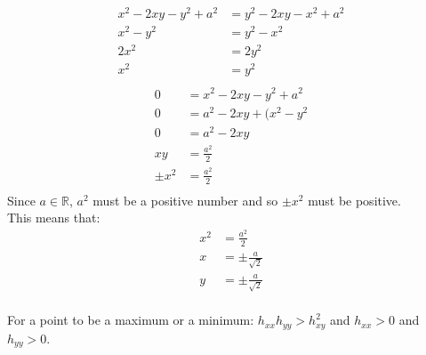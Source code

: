 \documentclass[10pt,\jkfside,a4paper]{article}
\begin{document}
\begin{enumerate}
\begin{equation}
\begin{split}
x^{2} - 2xy - y^{2} + a^2 &= y^{2} - 2xy - x^{2} + a^2 \\
x^{2} - y^{2} &= y^{2} - x^{2} \\
2x^{2} &= 2y^{2} \\
x^{2} &= y^{2} \\
\end{split}
\end{equation}
\begin{equation}
\begin{split}
0 &= x^{2} - 2xy - y^{2} + a^2 \\
0 &= a^2 - 2xy + (x^{2} - y^{2} \\
0 &= a^2 - 2xy \\
xy &= \frac{a^2}{2} \\
\pm x^{2} &= \frac{a^2}{2} \\
\end{split}
\end{equation}
Since $a \in \mathbb{R}$, $a^2$ must be a positive number and so $\pm x^{2}$ must be positive. \\
This means that:
\begin{equation}
\begin{split}
x^{2} &= \frac{a^2}{2} \\
x &= \pm \frac{a}{\sqrt{2}} \\
y &= \pm \frac{a}{\sqrt{2}} \\
\end{split}
\end{equation}

For a point to be a maximum or a minimum: $h_{xx}h_{yy} > h^2_{xy}$ and $h_{xx} > 0$ and $h_{yy} > 0$.


\end{enumerate}
\end{document}
